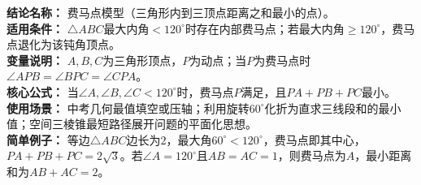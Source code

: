 \textbf{结论名称：} 费马点模型（三角形内到三顶点距离之和最小的点）。\\
\textbf{适用条件：} $\triangle ABC$最大内角$<120^\circ$时存在内部费马点；若最大内角$\geq120^\circ$，费马点退化为该钝角顶点。\\
\textbf{变量说明：} $A,B,C$为三角形顶点，$P$为动点；当$P$为费马点时$\angle APB=\angle BPC=\angle CPA$。\\
\textbf{核心公式：} 
当$\angle A,\angle B,\angle C<120^\circ$时，费马点$P$满足，且$PA+PB+PC$最小。\\
\textbf{使用场景：} 中考几何最值填空或压轴；利用旋转$60^\circ$化折为直求三线段和的最小值；空间三棱锥最短路径展开问题的平面化思想。\\
\textbf{简单例子：} 等边$\triangle ABC$边长为$2$，最大角$60^\circ<120^\circ$，费马点即其中心，$PA+PB+PC=2\sqrt{3}$。若$\angle A=120^\circ$且$AB=AC=1$，则费马点为$A$，最小距离和为$AB+AC=2$。